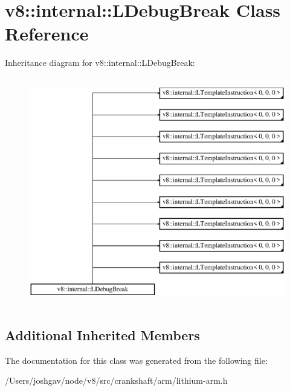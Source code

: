 \hypertarget{classv8_1_1internal_1_1_l_debug_break}{}\section{v8\+:\+:internal\+:\+:L\+Debug\+Break Class Reference}
\label{classv8_1_1internal_1_1_l_debug_break}
Inheritance diagram for v8\+:\+:internal\+:\+:L\+Debug\+Break\+:\begin{figure}[H]
\begin{center}
\leavevmode
\includegraphics[height=10.000000cm]{classv8_1_1internal_1_1_l_debug_break}
\end{center}
\end{figure}
\subsection*{Additional Inherited Members}


The documentation for this class was generated from the following file\+:\begin{DoxyCompactItemize}
\item 
/\+Users/joshgav/node/v8/src/crankshaft/arm/lithium-\/arm.\+h\end{DoxyCompactItemize}
